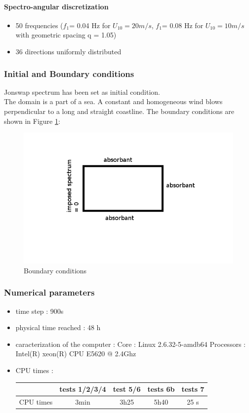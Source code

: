 \paragraph{Spectro-angular discretization}
\begin{itemize}
\item 50 frequencies ($f_1 $= 0.04 Hz for $U_{10} = 20m/s$, $f_1 $= 0.08 Hz for $U_{10} = 10m/s$ with geometric spacing q = 1.05)
\item 36 directions uniformly distributed
\end{itemize}

\subsubsection{Initial and Boundary conditions}
Jonswap spectrum has been set as initial condition.\\
The domain is a part of a sea. A constant and homogeneous wind blows perpendicular to a long and straight coastline. The boundary conditions are shown in Figure \ref{boundaryfet}:
\begin{figure}
\centering
\includegraphics[scale=0.5]{boundarycond.jpg}
\caption{Boundary conditions}
\label{boundaryfet}
\end{figure}
\subsubsection{Numerical parameters}
\begin{itemize}
\item time step : 900s
\item physical time reached : 48 h
\item caracterization of the computer : \subitem Core : Linux 2.6.32-5-amdb64 \subitem Processors : Intel(R)
xeon(R) CPU E5620 @ 2.4Ghz
\item CPU times : \\
\begin{tabular}{c|c|c|c|c}
 & tests 1/2/3/4 & test 5/6 &tests 6b & tests 7\\
 \hline
CPU times & 3min & 3h25 & 5h40 & 25 s \\
\end{tabular}
\end{itemize}

